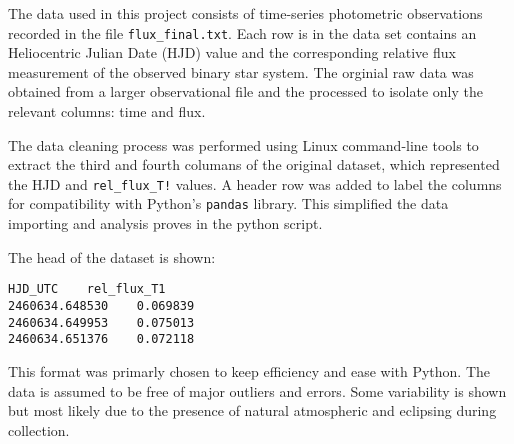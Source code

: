 The data used in this project consists of time-series photometric observations recorded in the 
file \texttt{flux\_final.txt}. Each row is in the data set contains an Heliocentric Julian Date 
(HJD) value and the corresponding relative flux measurement of the observed binary star system.
The orginial raw data was obtained from a larger observational file and the processed to isolate
only the relevant columns: time and flux.

The data cleaning process was performed using Linux command-line tools to extract the third and 
fourth columans of the original dataset, which represented the HJD and \texttt{rel\_flux\_T!} 
values. A header row was added to label the columns for compatibility with Python's \texttt{pandas}
library. This simplified the data importing and analysis proves in the python script.

The head of the dataset is shown:

\begin{verbatim}
HJD_UTC    rel_flux_T1
2460634.648530    0.069839
2460634.649953    0.075013
2460634.651376    0.072118
\end{verbatim}

This format was primarly chosen to keep efficiency and ease with Python. The data is assumed to
be free of major outliers and errors. Some variability is shown but most likely due to the presence 
of natural atmospheric and eclipsing during collection. 
